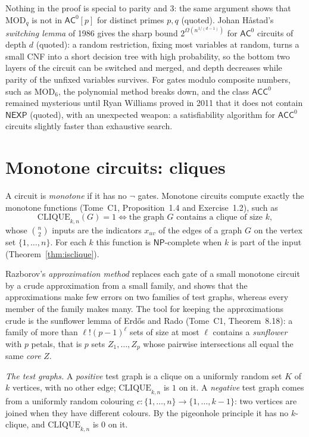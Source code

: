 Nothing in the proof is special to parity and $3$: the same argument shows that $\mathrm{MOD}_q$ is not in $\mathsf{AC}^0[p]$ for distinct primes $p,q$ (quoted). Johan Håstad's \emph{switching lemma} of 1986 gives the sharp bound $2^{\Omega(n^{1/(d-1)})}$ for $\mathsf{AC}^0$ circuits of depth $d$ (quoted): a random restriction, fixing most variables at random, turns a small CNF into a short decision tree with high probability, so the bottom two layers of the circuit can be switched and merged, and depth decreases while parity of the unfixed variables survives. For gates modulo composite numbers, such as $\mathrm{MOD}_6$, the polynomial method breaks down, and the class $\mathsf{ACC}^0$ remained mysterious until Ryan Williams proved in 2011 that it does not contain $\mathsf{NEXP}$ (quoted), with an unexpected weapon: a satisfiability algorithm for $\mathsf{ACC}^0$ circuits slightly faster than exhaustive search.

\section{Monotone circuits: cliques}\label{sec:monotone}

A circuit is \emph{monotone} if it has no $\lnot$ gates. Monotone circuits compute exactly the monotone functions (Tome~C1, Proposition~1.4 and Exercise~1.2), such as
\[
\mathrm{CLIQUE}_{k,n}(G)=1\iff\text{the graph }G\text{ contains a clique of size }k,
\]
whose $\binom n2$ inputs are the indicators $x_{uv}$ of the edges of a graph $G$ on the vertex set $\{1,\dots,n\}$. For each $k$ this function is $\mathsf{NP}$-complete when $k$ is part of the input (Theorem~\ref{thm:isclique}).

Razborov's \emph{approximation method} replaces each gate of a small monotone circuit by a crude approximation from a small family, and shows that the approximations make few errors on two families of test graphs, whereas every member of the family makes many. The tool for keeping the approximations crude is the sunflower lemma of Erd\H os and Rado (Tome~C1, Theorem~8.18): a family of more than $\ell!(p-1)^\ell$ sets of size at most $\ell$ contains a \emph{sunflower} with $p$ petals, that is $p$ sets $Z_1,\dots,Z_p$ whose pairwise intersections all equal the same \emph{core} $Z$.

\emph{The test graphs.} A \emph{positive} test graph is a clique on a uniformly random set $K$ of $k$ vertices, with no other edge; $\mathrm{CLIQUE}_{k,n}$ is $1$ on it. A \emph{negative} test graph comes from a uniformly random colouring $c:\{1,\dots,n\}\to\{1,\dots,k-1\}$: two vertices are joined when they have different colours. By the pigeonhole principle it has no $k$-clique, and $\mathrm{CLIQUE}_{k,n}$ is $0$ on it.

